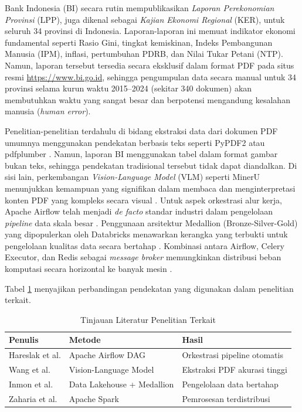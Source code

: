 \documentclass[10pt, a4paper, twocolumn]{article}
\begin{document}
Bank Indonesia (BI) secara rutin mempublikasikan \textit{Laporan Perekonomian Provinsi} (LPP), juga dikenal sebagai \textit{Kajian Ekonomi Regional} (KER), untuk seluruh 34 provinsi di Indonesia. Laporan-laporan ini memuat indikator ekonomi fundamental seperti Rasio Gini, tingkat kemiskinan, Indeks Pembangunan Manusia (IPM), inflasi, pertumbuhan PDRB, dan Nilai Tukar Petani (NTP). Namun, laporan tersebut tersedia secara eksklusif dalam format PDF pada situs resmi \url{https://www.bi.go.id}, sehingga pengumpulan data secara manual untuk 34 provinsi selama kurun waktu 2015--2024 (sekitar 340 dokumen) akan membutuhkan waktu yang sangat besar dan berpotensi mengandung kesalahan manusia (\textit{human error}).

Penelitian-penelitian terdahulu di bidang ekstraksi data dari dokumen PDF umumnya menggunakan pendekatan berbasis teks seperti PyPDF2 atau pdfplumber \cite{py_pdf_extraction}. Namun, laporan BI menggunakan tabel dalam format gambar bukan teks, sehingga pendekatan tradisional tersebut tidak dapat diandalkan. Di sisi lain, perkembangan \textit{Vision-Language Model} (VLM) seperti MinerU menunjukkan kemampuan yang signifikan dalam membaca dan menginterpretasi konten PDF yang kompleks secara visual \cite{mineru2024}. Untuk aspek orkestrasi alur kerja, Apache Airflow telah menjadi \textit{de facto} standar industri dalam pengelolaan \textit{pipeline} data skala besar \cite{harenslak2021}. Penggunaan arsitektur Medallion (Bronze-Silver-Gold) yang dipopulerkan oleh Databricks menawarkan kerangka yang terbukti untuk pengelolaan kualitas data secara bertahap \cite{databricks_medallion}. Kombinasi antara Airflow, Celery Executor, dan Redis sebagai \textit{message broker} memungkinkan distribusi beban komputasi secara horizontal ke banyak mesin \cite{airflow_docs}.

Tabel \ref{tab:literature} menyajikan perbandingan pendekatan yang digunakan dalam penelitian terkait.

\begin{table}[H]
\centering
\caption{Tinjauan Literatur Penelitian Terkait}
\label{tab:literature}
\fontsize{8}{10}\selectfont
\begin{tabularx}{\linewidth}{|>{\raggedright\arraybackslash}X|>{\raggedright\arraybackslash}X|>{\raggedright\arraybackslash}X|}
\hline
\textbf{Penulis} & \textbf{Metode} & \textbf{Hasil} \\
\hline
Hareslak et al. \cite{harenslak2021} & Apache Airflow DAG & Orkestrasi pipeline otomatis \\
\hline
Wang et al. \cite{mineru2024} & Vision-Language Model & Ekstraksi PDF akurasi tinggi \\
\hline
Inmon et al. \cite{inmon2021} & Data Lakehouse + Medallion & Pengelolaan data bertahap \\
\hline
Zaharia et al. \cite{zaharia2016} & Apache Spark & Pemrosesan terdistribusi \\
\hline
\end{tabularx}
\end{table}
\end{document}
